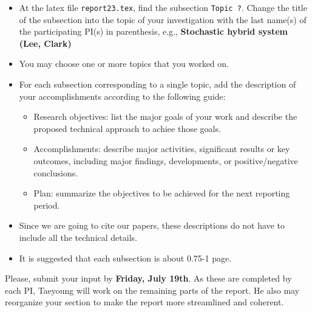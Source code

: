 \documentclass[letterpaper,11pt]{article}
\begin{document}
\begin{enumerate}
\begin{itemize}
            \item At the latex file \texttt{report23.tex}, find the subsection \texttt{Topic ?}. Change the title of the subsection into the topic of your investigation with the last name(s) of the participating PI(s) in parenthesis, e.g., \textbf{Stochastic hybrid system (Lee, Clark)}
            \item You may choose one or more topics that you worked on. 
            \item For each subsection corresponding to a single topic, add the description of your accomplishments according to the following guide:
                \begin{itemize}
                    \item Research objectives: list the major goals of your work and describe the proposed technical approach to achiee those goals.
                    \item Accomplishments: describe major activities, significant results or key outcomes, including major findings, developments, or positive/negative conclusions. 
                    \item Plan: summarize the objectives to be achieved for the next reporting period. 
                \end{itemize}
            \item Since we are going to cite our papers, these descriptions do not have to include all the technical details. 
            \item It is suggested that each subsection is about 0.75-1 page. 
        \end{itemize}
\end{enumerate}

Please, submit your input by \textbf{Friday, July 19th}. 
As these are completed by each PI, Taeyoung will work on the remaining parts of the report. He also may reorganize your section to make the report more streamlined and coherent.  
\end{document}
